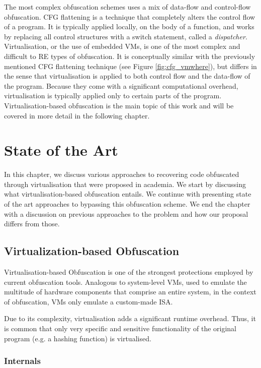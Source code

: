 The most complex obfuscation schemes uses a mix of data-flow and control-flow obfuscation. \gls{CFG} flattening is a technique that completely alters the control flow of a program. It is typically applied locally, on the body of a function, and works by replacing all control structures with a switch statement, called a \emph{dispatcher}. Virtualisation, or the use of embedded \glspl{VM}, is one of the most complex and difficult to \gls{RE} types of obfuscation. It is conceptually similar with the previously mentioned \gls{CFG} flattening technique (see Figure \ref{fig:cfg_vmwhere}), but differs in the sense that virtualisation is applied to both control flow and the data-flow of the program. Because they come with a significant computational overhead, virtualisation is typically applied only to certain parts of the program. Virtualisation-based obfuscation is the main topic of this work and will be covered in more detail in the following chapter.

\chapter{State of the Art}

In this chapter, we discuss various approaches to recovering code obfuscated through virtualisation that were proposed in academia. We start by discussing what virtualisation-based obfuscation entails. We continue with presenting state of the art approaches to bypassing this obfuscation scheme. We end the chapter with a discussion on previous approaches to the problem and how our proposal differs from those.

\section{Virtualization-based Obfuscation}

Virtualisation-based Obfuscation is one of the strongest protections employed by current obfuscation tools. Analogous to system-level \glspl{VM}, used to emulate the multitude of hardware components that comprise an entire system, in the context of obfuscation, \glspl{VM} only emulate a custom-made \gls{ISA}. 

Due to its complexity, virtualisation adds a significant runtime overhead. Thus, it is common that only very specific and sensitive functionality of the original program (e.g. a hashing function) is virtualised.

\subsection{Internals}


